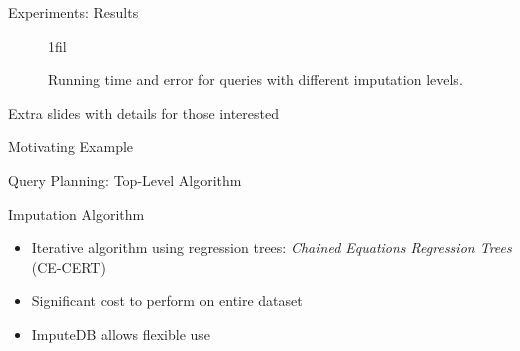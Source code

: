 \documentclass{beamer}
\makeatletter
\newcommand*{\centerfloat}{%
  \parindent \z@
  \leftskip \z@ \@plus 1fil \@minus \textwidth
  \rightskip\leftskip
  \parfillskip \z@skip}
\newcommand{\ProjectName}{ImputeDB}
\makeatother
\begin{document}
\begin{frame}[fragile]{Experiments: Results}
\begin{figure}
  \tiny
  \centerfloat
  
  \caption{Running time and error for queries with different imputation levels.}
  \label{fig:experiments}
\end{figure}
\end{frame}

\begin{frame}
	\center
	Extra slides with details for those interested
\end{frame}

\begin{frame}[fragile]{Motivating Example}
\end{frame}


\begin{frame}[fragile]{Query Planning: Top-Level Algorithm}

\begin{algorithm}[H]
\scriptsize

\end{algorithm}

\end{frame}

\begin{frame}[fragile]{Imputation Algorithm}
\begin{itemize}
	\item Iterative algorithm using regression trees: \textit{Chained Equations Regression Trees} (CE-CERT)\cite{burgette2010multiple}
	\item Significant cost to perform on entire dataset
	\item \ProjectName{} allows flexible use
\end{itemize}
\scriptsize

\begin{algorithm}[H]
\scriptsize

\end{algorithm}
\end{frame}
\end{document}
